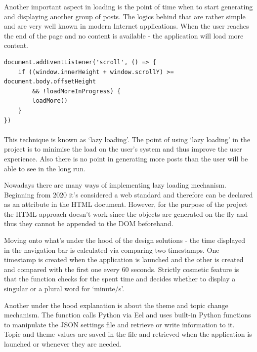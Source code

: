 \documentclass[12pt]{report}
\newenvironment{code}{\captionsetup{type=listing}}{}
\begin{document}
Another important aspect in loading is the point of time when to start generating and displaying another group of posts. The logics behind that are rather simple and are very well known
in modern Internet applications. When the user reaches the end of the page and no content is available - the application will load more content.

\begin{code}
\begin{verbatim}
document.addEventListener('scroll', () => {
    if ((window.innerHeight + window.scrollY) >= document.body.offsetHeight
        && !loadMoreInProgress) {
        loadMore()
    }
})
\end{verbatim}
\end{code}

\paragraph*{}

This technique is known as `lazy loading'. The point of using `lazy loading' in the project is to minimise the load on the user's system
and thus improve the user experience. Also there is no point in generating more posts than the user will be able to see in the long run.

Nowadays there are many ways of implementing lazy loading mechanism. Beginning from 2020 it's considered a web standard and therefore
can be declared as an attribute in the HTML document. However, for the purpose of the project the HTML approach doesn't work since the objects
are generated on the fly and thus they cannot be appended to the DOM beforehand.

Moving onto what's under the hood of the design solutions - the time displayed in the navigation bar is calculated via comparing two timestamps.
One timestamp is created when the application is launched and the other is created and compared with the first one every 60 seconds.
Strictly cosmetic feature is that the function checks for the spent time and decides whether to display a singular or a plural word for `minute/s'.

Another under the hood explanation is about the theme and topic change mechanism. The function calls Python via Eel and uses built-in Python
functions to manipulate the JSON settings file and retrieve or write information to it. Topic and theme values are saved in the file and retrieved
when the application is launched or whenever they are needed.
\end{document}
